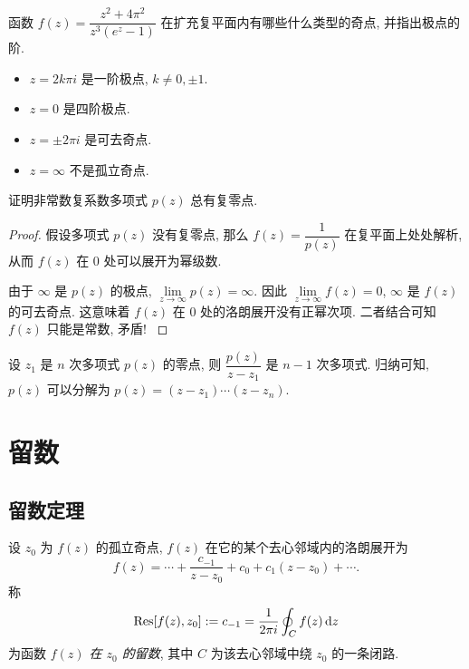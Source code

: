 \documentclass[nocolor,theme=doremi,lang=cn,11pt,chinese,twoside,openright,usesamecnt]{elegantbook}
\begin{document}
\begin{exercise}
	函数 $f(z)=\dfrac{z^2+4\pi^2}{z^3(e^z-1)}$ 在扩充复平面内有哪些什么类型的奇点, 并指出极点的阶.
\end{exercise}

\begin{answer}
	\begin{itemize}
		\item $z=2k\pi i$ 是一阶极点, $k\neq 0,\pm1$.
		\item $z=0$ 是四阶极点.
		\item $z=\pm 2\pi i$ 是可去奇点.
		\item $z=\infty$ 不是孤立奇点.
	\end{itemize}
\end{answer}

\begin{example}
	证明非常数复系数多项式 $p(z)$ 总有复零点.
\end{example}

\begin{proof}
	假设多项式 $p(z)$ 没有复零点, 那么 $f(z)=\dfrac1{p(z)}$ 在复平面上处处解析, 
{%
	从而 $f(z)$ 在 $0$ 处可以展开为幂级数.
}

{%
	由于 $\infty$ 是 $p(z)$ 的极点, $\lim\limits_{z\to\infty}p(z)=\infty$.
}%
{%
	因此 $\lim\limits_{z\to\infty}f(z)=0$, $\infty$ 是 $f(z)$ 的可去奇点.
}%
{%
	这意味着 $f(z)$ 在 $0$ 处的洛朗展开没有正幂次项.
}%
{%
	二者结合可知 $f(z)$ 只能是常数, 矛盾!\qedhere
}
\end{proof}

设 $z_1$ 是 $n$ 次多项式 $p(z)$ 的零点, 则 $\dfrac{p(z)}{z-z_1}$ 是 $n-1$ 次多项式.
归纳可知, $p(z)$ 可以分解为 $p(z)=(z-z_1)\cdots(z-z_n)$.

\section{留数}

\subsection{留数定理}

\begin{definition}
	设 $z_0$ 为 $f(z)$ 的孤立奇点, $f(z)$ 在它的某个去心邻域内的洛朗展开为
		\[f(z)=\cdots+\frac{c_{-1}}{z-z_0}+c_0+c_1(z-z_0)+\cdots.\]
	称
		\[{\mathrm{Res}}[f(z),z_0]:=c_{-1}=\frac1{2\pi i}\oint_Cf(z)\,\mathrm{d} z\]
	为函数 \emph{$f(z)$ 在 $z_0$ 的留数}, 其中 $C$ 为该去心邻域中绕 $z_0$ 的一条闭路.
\end{definition}
\end{document}
